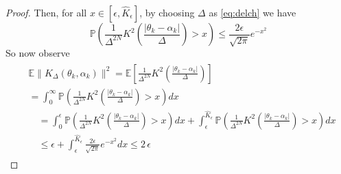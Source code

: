\documentclass[journal,onecolumn]{IEEEtran}
\newcommand{\alk}{\alpha_k}
\newcommand{\thk}{\theta_k}
\newcommand{\step}{\epsilon}
\newcommand{\CE}{\mathbb{E}}
\newcommand{\PR}{\mathbb{P}}
\newcommand{\dimn}{N}
\newcommand{\K}{K}
\newcommand{\Kd}{\K_{\Delta}}
\newcommand{\ksup}{\hat{K}}
\begin{document}
{\begin{proof}
Then, for all $x \in [\step,\ksup_{\step}]$, by choosing $\Delta$ as \eqref{eq:delch} we have
\[\PR\left( \frac{1}{\Delta^{2\dimn}}K^2\left(\frac{|\thk-\alk|}{\Delta}\right) > x \right) \leq  \frac{2\step}{\sqrt{2\pi}} e^{-x^2}\]
So now observe 
\begin{align*}
    \begin{split}
        &\CE\|\Kd(\thk,\alk)\|^2 = \CE\left[\frac{1}{\Delta^{2\dimn}} K^2\left(\frac{|\thk-\alk|}{\Delta}\right)\right] \\
        &= \int_0^{\infty}\PR\left(\frac{1}{\Delta^{2\dimn}}K^2\left(\frac{|\thk-\alk|}{\Delta}\right) > x \right)dx \\
        & \quad = \int_0^{\step}\PR\left(\frac{1}{\Delta^{2\dimn}}K^2\left(\frac{|\thk-\alk|}{\Delta}\right) > x \right)dx  + \int_{\step}^{\ksup_{\step}}\PR\left(\frac{1}{\Delta^{2\dimn}}K^2\left(\frac{|\thk-\alk|}{\Delta}\right) > x \right)dx \\
        & \quad \leq \step + \int_{\step}^{\ksup_{\step}} \frac{2\step}{\sqrt{2\pi}} e^{-x^2} dx \leq 2\,\step
    \end{split}
\end{align*}
\end{proof}

}
\end{document}
